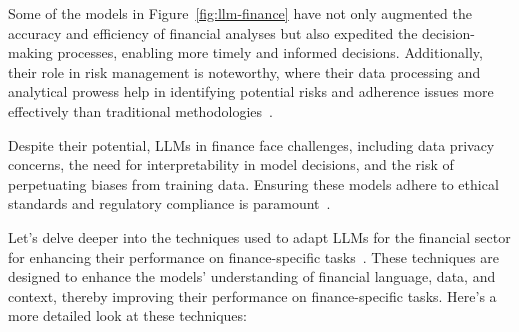 Some of the models in Figure~\ref{fig:llm-finance} have not only augmented the accuracy and efficiency of financial analyses but also expedited the decision-making processes, enabling more timely and informed decisions.
Additionally, their role in risk management is noteworthy, where their data processing and analytical prowess help in identifying potential risks and adherence issues more effectively than traditional methodologies~\cite{buehler2018deep}.

Despite their potential, LLMs in finance face challenges, including data privacy concerns, the need for interpretability in model decisions, and the risk of perpetuating biases from training data.
Ensuring these models adhere to ethical standards and regulatory compliance is paramount~\cite{jones2020ethical, buehler2018deep}.

Let's delve deeper into the techniques used to adapt LLMs for the financial sector for enhancing their performance on finance-specific tasks~\cite{lee2024survey}.
These techniques are designed to enhance the models' understanding of financial language, data, and context, thereby improving their performance on finance-specific tasks.
Here's a more detailed look at these techniques:

